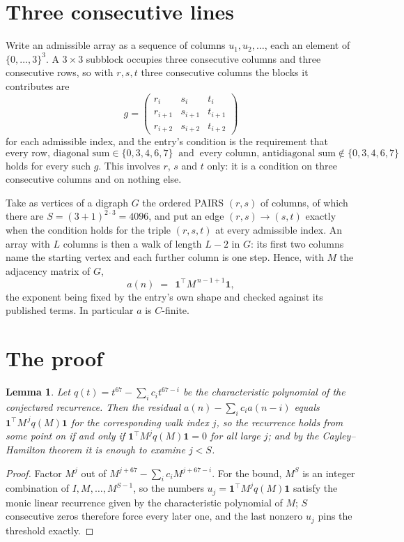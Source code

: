 \documentclass[11pt,a4paper]{article}
\theoremstyle{plain}
\newtheorem{lemma}[theorem]{Lemma}
\theoremstyle{definition}
\begin{document}
\section{Three consecutive lines}

Write an admissible array as a sequence of columns $u_1,u_2,\dots$, each an element of
$\{0,\dots,3\}^{3}$. A $3\times3$ subblock occupies three consecutive columns and
three consecutive rows, so with $r,s,t$ three consecutive columns the blocks it
contributes are
\[
g=\begin{pmatrix}r_i&s_i&t_i\\ r_{i+1}&s_{i+1}&t_{i+1}\\ r_{i+2}&s_{i+2}&t_{i+2}\end{pmatrix}
\]
for each admissible index, and the entry's condition is the requirement that
\[
\text{every row, diagonal sum} \in \{0,3,4,6,7\}\ \text{ and }\ \text{every column, antidiagonal sum} \notin \{0,3,4,6,7\}
\]
holds for every such $g$. This involves $r$, $s$ and $t$ only: it is a condition on
three consecutive columns and on nothing else.

Take as vertices of a digraph $G$ the ordered PAIRS $(r,s)$ of columns, of which there are
$S=(3+1)^{2\cdot3}=4096$, and put an edge $(r,s)\to(s,t)$ exactly when the condition
holds for the triple $(r,s,t)$ at every admissible index. An array with $L$ columns is then a
walk of length $L-2$ in $G$: its first two columns name the starting vertex and each further
column is one step. Hence, with $M$ the adjacency matrix of $G$,
\[
a(n)\;=\;\,\mathbf{1}^{\!\top}M^{\,n-1+1}\mathbf{1},
\]
the exponent being fixed by the entry's own shape and checked against its published terms.
In particular $a$ is $C$-finite.

\section{The proof}

\begin{lemma}\label{lem:crit}
Let $q(t)=t^{67}-\sum_i c_it^{67-i}$ be the characteristic polynomial of the
conjectured recurrence. Then the residual $a(n)-\sum_ic_ia(n-i)$ equals
$\mathbf{1}^{\!\top}M^{\,j}q(M)\mathbf{1}$ for the corresponding walk index
$j$, so the recurrence holds from some point on if and only if
$\mathbf{1}^{\!\top}M^{j}q(M)\mathbf{1}=0$ for all large $j$; and by the
Cayley--Hamilton theorem it is enough to examine $j<S$.
\end{lemma}

\begin{proof}
Factor $M^{j}$ out of $M^{j+67}-\sum_ic_iM^{j+67-i}$. For the bound, $M^{S}$
is an integer combination of $I,M,\dots,M^{S-1}$, so the numbers
$u_j=\mathbf{1}^{\!\top}M^{j}q(M)\mathbf{1}$ satisfy the monic linear recurrence given by
the characteristic polynomial of $M$; $S$ consecutive zeros therefore force every later one,
and the last nonzero $u_j$ pins the threshold exactly.
\end{proof}
\end{document}
